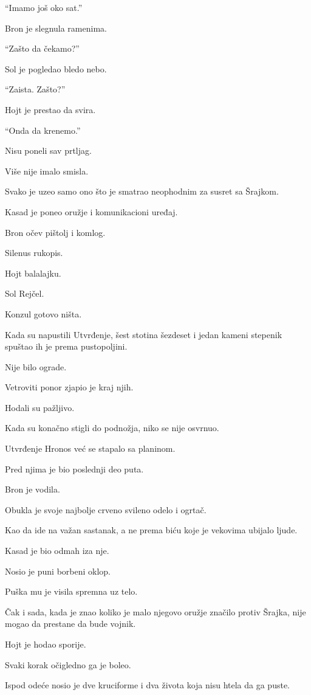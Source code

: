 ``Imamo još oko sat.''

Bron je slegnula ramenima.

``Zašto da čekamo?''

Sol je pogledao bledo nebo.

``Zaista. Zašto?''

Hojt je prestao da svira.

``Onda da krenemo.''

\bigskip

Nisu poneli sav prtljag.

Više nije imalo smisla.

Svako je uzeo samo ono što je smatrao neophodnim za susret sa Šrajkom.

Kasad je poneo oružje i komunikacioni uređaj.

Bron očev pištolj i komlog.

Silenus rukopis.

Hojt balalajku.

Sol Rejčel.

Konzul gotovo ništa.

Kada su napustili Utvrđenje, šest stotina šezdeset i jedan kameni stepenik spuštao ih je prema pustopoljini.

Nije bilo ograde.

Vetroviti ponor zjapio je kraj njih.

Hodali su pažljivo.

Kada su konačno stigli do podnožja, niko se nije osvrnuo.

Utvrđenje Hronos već se stapalo sa planinom.

Pred njima je bio poslednji deo puta.

\bigskip

Bron je vodila.

Obukla je svoje najbolje crveno svileno odelo i ogrtač.

Kao da ide na važan sastanak, a ne prema biću koje je vekovima ubijalo ljude.

Kasad je bio odmah iza nje.

Nosio je puni borbeni oklop.

Puška mu je visila spremna uz telo.

Čak i sada, kada je znao koliko je malo njegovo oružje značilo protiv Šrajka, nije mogao da prestane da bude vojnik.

Hojt je hodao sporije.

Svaki korak očigledno ga je boleo.

Ispod odeće nosio je dve kruciforme i dva života koja nisu htela da ga puste.

